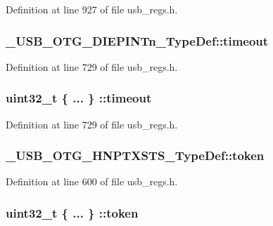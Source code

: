 Definition at line 927 of file usb\-\_\-regs.\-h.

\hypertarget{group___u_s_b___o_t_g___d_r_i_v_e_r_gaedd142332bb66001ab7d866e151c1950}{
\subsubsection[{timeout}]{ \-\_\-\-U\-S\-B\-\_\-\-O\-T\-G\-\_\-\-D\-I\-E\-P\-I\-N\-Tn\-\_\-\-Type\-Def\-::timeout}}\label{group___u_s_b___o_t_g___d_r_i_v_e_r_gaedd142332bb66001ab7d866e151c1950}


Definition at line 729 of file usb\-\_\-regs.\-h.

\hypertarget{group___u_s_b___o_t_g___d_r_i_v_e_r_gaf74109a431c3f015c624090b42e7f550}{
\subsubsection[{timeout}]{\setlength{\rightskip}{0pt plus 5cm}uint32\-\_\-t \{ ... \} \-::timeout}}\label{group___u_s_b___o_t_g___d_r_i_v_e_r_gaf74109a431c3f015c624090b42e7f550}


Definition at line 729 of file usb\-\_\-regs.\-h.

\hypertarget{group___u_s_b___o_t_g___d_r_i_v_e_r_gae107b5535ca75e09689f2e18a7f0a7d9}{
\subsubsection[{token}]{ \-\_\-\-U\-S\-B\-\_\-\-O\-T\-G\-\_\-\-H\-N\-P\-T\-X\-S\-T\-S\-\_\-\-Type\-Def\-::token}}\label{group___u_s_b___o_t_g___d_r_i_v_e_r_gae107b5535ca75e09689f2e18a7f0a7d9}


Definition at line 600 of file usb\-\_\-regs.\-h.

\hypertarget{group___u_s_b___o_t_g___d_r_i_v_e_r_ga268cadf7d7c14eadcac0630d0581b96d}{
\subsubsection[{token}]{\setlength{\rightskip}{0pt plus 5cm}uint32\-\_\-t \{ ... \} \-::token}}\label{group___u_s_b___o_t_g___d_r_i_v_e_r_ga268cadf7d7c14eadcac0630d0581b96d}


